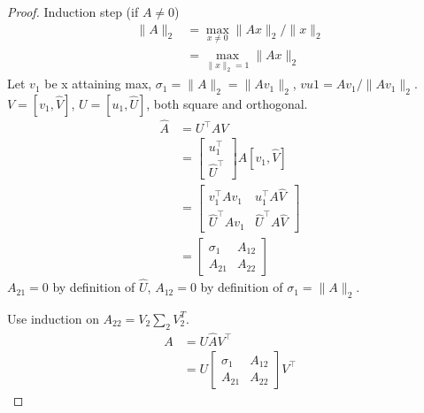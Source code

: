 \documentclass[11pt]{article}
\numberwithin{equation}{section}
\begin{document}
\begin{theorem}
\begin{proof}
        Induction step (if $A \neq 0$)
        \begin{align*}
            \|A\|_2 &= \max _{x \neq 0} \|Ax\|_2 / \|x\|_2 \\
            &= \max _{\|x\|_2=1}  \|Ax\|_2
        \end{align*}
        Let $v_1$ be x attaining max, $\sigma_1= \|A\|_2= \|Av_1\|_2$, $vu1=Av_1/ \|Av_1\|_2$. $V=\left[v_1, \hat{V}\right]$, $U=\left[u_1, \hat{U}\right]$, both square and orthogonal.
        \begin{align*}
            \hat{A} &=U^{\top} A V\\
            &= \left[\begin{array}{c}
                u_1^{\top} \\
                \hat{U}^{\top}
                \end{array}\right] A[v_1, \hat{V}]\\
                &= \left[\begin{array}{ll}
                    v_1^{\top} A v_1 & u_1^{\top} A \hat{V} \\
                    \hat{U}^{\top} A v_1 & \hat{U}^{\top} A \hat{V} 
                    \end{array}\right]\\
                &= \left[\begin{array}{cc}
                    \sigma_{1} & A_{12} \\
                    A_{21} & A_{22}
                    \end{array}\right]
        \end{align*}
        $A_{21}=0$ by definition of $\hat{U}$, $A_{12}=0$ by definition of $\sigma_1=\|A\|_2$.

        Use induction on $A_{22}=V_{2} \sum_{2} V_{2}^{T}$.
        \begin{align*}
            A &= U \hat{A} V^\top \\
            &= U \left[\begin{array}{cc}
                \sigma_{1} & A_{12} \\
                A_{21} & A_{22}
                \end{array}\right] V^\top
        \end{align*}
    \end{proof}
\end{theorem}
\end{document}
